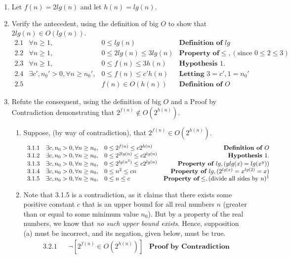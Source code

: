 \documentclass{article}
\begin{document}
\begin{enumerate}
  \item Let $f(n) = 2lg(n)$ and let $h(n) = lg(n)$.
  \item Verify the antecedent, using the definition of big $O$ to show that $2lg(n) \in O(lg(n))$.
  \[
  \begin{array}{lrlr} 
    2.1 & \forall n \ge 1, & 0 \le lg(n) & \textbf{Definition of } lg \\
    2.2 & \forall n \ge 1, & 0 \le 2lg(n) \le 3lg(n) & \textbf{Property of} \le , (\text{since } 0 \le 2 \le 3) \\
    2.3 & \forall n \ge 1, & 0 \le f(n) \le 3h(n) & \textbf{Hypothesis } 1. \\
    2.4 & \exists c', n_{0}' > 0, \forall n \ge n_{0}', & 0 \le f(n) \le c'h(n) & \textbf{Letting } 3 = c', 1 = n_{0}' \\
    2.5 & & f(n) \in O(h(n)) & \textbf{Definition of } O
  \end{array}
  \]
  \item Refute the consequent, using the definition of big $O$ and a Proof by Contradiction demonstrating that $2^{f(n)} \notin O(2^{h(n)})$.
  \begin{enumerate}
    \item Suppose, (by way of contradiction), that $2^{f(n)} \in O(2^{h(n)})$.
    \[
    \begin{array}{lrlr}
      3.1.1 & \exists c, n_{0} > 0, \forall n \ge n_{0}, & 0 \le 2^{f(n)} \le c2^{h(n)} & \textbf{Definition of } O \\
      3.1.2 & \exists c, n_{0} > 0, \forall n \ge n_{0}, & 0 \le 2^{2lg(n)} \le c2^{lg(n)} & \textbf{Hypothesis } 1. \\
      3.1.3 & \exists c, n_{0} > 0, \forall n \ge n_{0}, & 0 \le 2^{lg(n^{2})} \le c2^{lg(n)} & \textbf{Property of } lg, (ylg(x) = lg(x^{y})) \\
      3.1.4 & \exists c, n_{0} > 0, \forall n \ge n_{0}, & 0 \le n^{2} \le cn & \textbf{Property of } lg, (2^{lg(x)} = x^{lg(2)} = x) \\
      3.1.5 & \exists c, n_{0} > 0, \forall n \ge n_{0}, & 0 \le n \le c & \textbf{Property of} \le, (\text{divide all sides by } n)\footnotemark[1]
    \end{array}
    \]
    \item Note that 3.1.5 is a contradiction, as it claims that there exists some positive constant $c$ that is an upper bound for all real numbers $n$ (greater than or equal to some minimum value $n_{0}$). But by a property of the real numbers, we know that \emph{no such upper bound exists}. Hence, supposition (a) must be incorrect, and its negation, given below, must be true.
    \[
    \begin{array}{lrlr}
      3.2.1 & & \neg[2^{f(n)} \in O(2^{h(n)})] & \textbf{Proof by Contradiction}
    \end{array}
    \]


\end{enumerate}
\end{enumerate}
\end{document}
